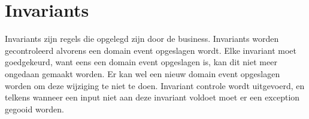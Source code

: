 
\section{Invariants}
\label{sec:invariants}

Invariants zijn regels die opgelegd zijn door de business. Invariants worden gecontroleerd alvorens een domain event opgeslagen wordt. Elke invariant moet goedgekeurd, want eens een domain event opgeslagen is, kan dit niet meer ongedaan gemaakt worden. Er kan wel een nieuw domain event opgeslagen worden om deze wijziging te niet te doen. Invariant controle wordt uitgevoerd, en telkens wanneer een input niet aan deze invariant voldoet moet er een exception gegooid worden.

